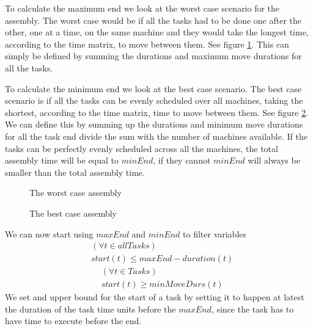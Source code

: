  To calculate the maximum end we look at the worst case scenario for the assembly. The worst case would be if all the tasks had to be done one after the other, one at a time, on the same machine and they would take the longest time, according to the time matrix, to move between them. See figure \ref{fig:worst_case}. This can simply be defined by summing the durations and maximum move durations for all the tasks.
 
 To calculate the minimum end we look at the best case scenario. The best case scenario is if all the tasks can be evenly scheduled over all machines, taking the shortest, according to the time matrix, time to move between them. See figure \ref{fig:best_case}. We can define this by summing up the durations and minimum move durations for all the task end divide the sum with the number of machines available. If the tasks can be perfectly evenly scheduled across all the machines, the total assembly time will be equal to $minEnd$, if they cannot $minEnd$ will always be smaller than the total assembly time.
 
  \begin{figure}
  	\centering
  	
  	\caption{The worst case assembly}
  	\label{fig:worst_case}
  \end{figure}
   \begin{figure}
   	\centering
   	
   	\caption{The best case assembly}
   	\label{fig:best_case}
   \end{figure}
 \newpage
 We can now start using $maxEnd$ and $minEnd$ to filter variables
  \begin{equation}\label{eq:lim_start_over}
  \begin{aligned}
 &(\forall t \in allTasks)\\
 &start(t) \le maxEnd-duration(t)
  \end{aligned}
  \end{equation}
   \begin{equation}\label{eq:lim_start_under}
  \begin{aligned}
 &(\forall t \in Tasks)\\
 &start(t) \ge minMoveDurs(t)
  \end{aligned}
  \end{equation}
 We set and upper bound for the start of a task by setting it to happen at latest the duration of the task time units before the $maxEnd$, since the task has to have time to execute before the end.
 
